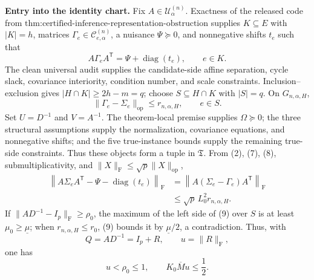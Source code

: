\textbf{Entry into the identity chart.} Fix \(A\in\mathcal U^{(n)}_\alpha\). Exactness of the released code from \(\text{thm:certified-inference-representation-obstruction}\) supplies \(K\subseteq E\) with \(|K|=h\), matrices \(\Gamma_e\in\mathcal C^{(n)}_{e,\alpha}\), a nuisance \(\Psi\succeq0\), and nonnegative shifts \(t_e\) such that
\[
A\Gamma_eA^{\mathsf T}=\Psi+\operatorname{diag}(t_e),
\qquad e\in K.
\tag{7}
\]
The clean universal audit supplies the candidate-side affine separation, cycle slack, covariance interiority, condition number, and scale constraints. Inclusion--exclusion gives \(|H\cap K|\geq2h-m=q\); choose \(S\subseteq H\cap K\) with \(|S|=q\). On \(G_{n,\alpha,H}\),
\[
\|\Gamma_e-\Sigma_e\|_{\mathrm{op}}
\leq r_{n,\alpha,H},
\qquad e\in S.
\tag{8}
\]
Set \(U=D^{-1}\) and \(V=A^{-1}\). The theorem-local premise supplies \(\Omega\succeq0\); the three structural assumptions supply the normalization, covariance equations, and nonnegative shifts; and the five true-instance bounds supply the remaining true-side constraints. Thus these objects form a tuple in \(\mathfrak T\). From (2), (7), (8), submultiplicativity, and \(\|X\|_{\mathrm F}\leq\sqrt p\|X\|_{\mathrm{op}}\),
\[
\begin{aligned}
\left\|A\Sigma_eA^{\mathsf T}-\Psi-\operatorname{diag}(t_e)\right\|_{\mathrm F}
&=\left\|A(\Sigma_e-\Gamma_e)A^{\mathsf T}\right\|_{\mathrm F}\\
&\leq\sqrt p\,L_0^2r_{n,\alpha,H}.
\end{aligned}
\tag{9}
\]
If \(\|AD^{-1}-I_p\|_{\mathrm F}\geq\rho_0\), the maximum of the left side of (9) over \(S\) is at least \(\mu_0\geq\underline\mu\); when \(r_{n,\alpha,H}\leq r_0\), (9) bounds it by \(\underline\mu/2\), a contradiction. Thus, with
\[
Q=AD^{-1}=I_p+R,
\qquad u=\|R\|_{\mathrm F},
\]
one has
\[
u<\rho_0\leq1,
\qquad K_0\overline M u\leq\frac12.
\tag{10}
\]

